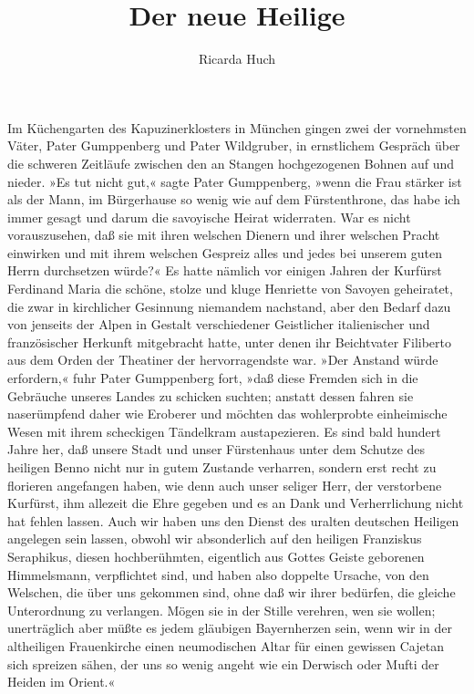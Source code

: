 \usepackage[german,ngerman]{babel}
\usepackage[T1]{fontenc}




\raggedbottom

\author{Ricarda Huch}
\title{Der neue Heilige}
\date{}
\lowertitleback{Diese Ausgabe basiert auf dem
  \href{http://www.gutenberg.net/}{Project Gutenberg}
  EBook \#27446.}

\maketitle

\pagenum{[95]}Im Küchengarten des Kapuzinerklosters in München gingen zwei der
vornehmsten Väter, Pater Gumppenberg und Pater Wildgruber, in
ernstlichem Gespräch über die schweren Zeitläufe zwischen den an
Stangen hochgezogenen Bohnen auf und nieder. »Es tut nicht gut,«
sagte Pater Gumppenberg, »wenn die Frau stärker ist als der Mann,
im Bürgerhause so wenig wie auf dem Fürstenthrone, das habe ich
immer gesagt und darum die savoyische Heirat widerraten. War es
nicht vorauszusehen, daß sie mit ihren welschen Dienern und ihrer
welschen Pracht einwirken und mit ihrem welschen Gespreiz alles und
jedes bei unserem guten Herrn durchsetzen würde?« Es hatte nämlich
vor einigen Jahren der Kurfürst Ferdinand Maria die schöne, stolze
und kluge Henriette von Savoyen geheiratet, die zwar in kirchlicher
Gesinnung niemandem nachstand, aber den Bedarf dazu von jenseits
der Alpen in Gestalt verschiedener Geistlicher italienischer und
französischer Herkunft mitgebracht hatte, unter denen ihr
Beichtvater Filiberto aus dem Orden der Theatiner der
hervorragendste war. »Der Anstand würde erfordern,« fuhr Pater
Gumppenberg fort, »daß diese Fremden sich in die Gebräuche unseres
Landes zu schicken suchten; anstatt dessen fahren sie naserümpfend
daher wie Eroberer und möchten das wohlerprobte einheimische Wesen
mit ihrem scheckigen Tändelkram austapezieren. Es sind bald hundert
Jahre her, daß unsere Stadt und unser Fürstenhaus unter dem Schutze
des heiligen\pagenum{[96]} Benno nicht nur in gutem Zustande
verharren, sondern erst recht zu florieren angefangen haben, wie
denn auch unser seliger Herr, der verstorbene Kurfürst, ihm
allezeit die Ehre gegeben und es an Dank und Verherrlichung nicht
hat fehlen lassen. Auch wir haben uns den Dienst des uralten
deutschen Heiligen angelegen sein lassen, obwohl wir absonderlich
auf den heiligen Franziskus Seraphikus, diesen hochberühmten,
eigentlich aus Gottes Geiste geborenen Himmelsmann, verpflichtet
sind, und haben also doppelte Ursache, von den Welschen, die über
uns gekommen sind, ohne daß wir ihrer bedürfen, die gleiche
Unterordnung zu verlangen. Mögen sie in der Stille verehren, wen
sie wollen; unerträglich aber müßte es jedem gläubigen Bayernherzen
sein, wenn wir in der altheiligen Frauenkirche einen neumodischen
Altar für einen gewissen Cajetan sich spreizen sähen, der uns so
wenig angeht wie ein Derwisch oder Mufti der Heiden im Orient.«

